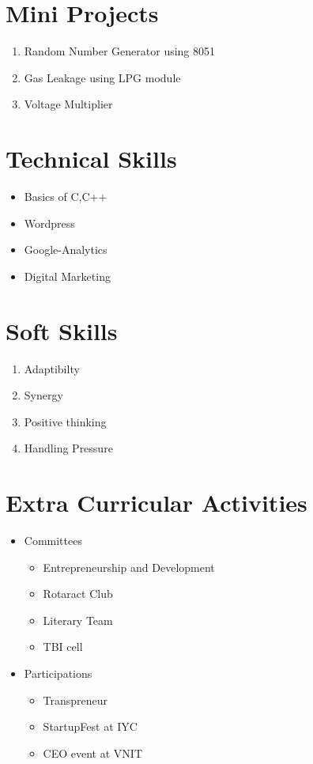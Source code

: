 \documentclass{article}
\begin{document}
\section{Mini Projects}
\begin{enumerate}
	\item Random Number Generator using 8051
	\item Gas Leakage using LPG module
	\item Voltage Multiplier
\end{enumerate}
\section{Technical Skills}
\begin{itemize}
	\item Basics of C,C++
	\item Wordpress
	\item Google-Analytics
	\item Digital Marketing
\end{itemize}
\section{Soft Skills}
\begin{enumerate}
	\item Adaptibilty
	\item Synergy
	\item Positive thinking
	\item Handling Pressure
\end{enumerate}
\section{Extra Curricular Activities}
\begin{itemize}
	\item{ Committees
		\begin{itemize}
			\item Entrepreneurship and Development
			\item Rotaract Club
			\item Literary Team
			\item TBI cell
	\end{itemize}}
	\item { Participations
		\begin{itemize}
			\item Transpreneur
			\item StartupFest at IYC
			\item CEO event at VNIT
	\end{itemize}}
\end{itemize}
\end{document}

